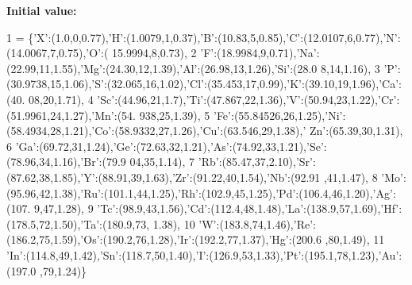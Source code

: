 {\bfseries Initial value\+:}
\begin{DoxyCode}
1 =  \{\textcolor{stringliteral}{'X'}:(1.0,0,0.77),\textcolor{stringliteral}{'H'}:(1.0079,1,0.37),\textcolor{stringliteral}{'B'}:(10.83,5,0.85),\textcolor{stringliteral}{'C'}:(12.0107,6,0.77),\textcolor{stringliteral}{'N'}:(14.0067,7,0.75),\textcolor{stringliteral}{'O'}:(
      15.9994,8,0.73),
2              \textcolor{stringliteral}{'F'}:(18.9984,9,0.71),\textcolor{stringliteral}{'Na'}:(22.99,11,1.55),\textcolor{stringliteral}{'Mg'}:(24.30,12,1.39),\textcolor{stringliteral}{'Al'}:(26.98,13,1.26),\textcolor{stringliteral}{'Si'}:(28.0
      8,14,1.16),
3              \textcolor{stringliteral}{'P'}:(30.9738,15,1.06),\textcolor{stringliteral}{'S'}:(32.065,16,1.02),\textcolor{stringliteral}{'Cl'}:(35.453,17,0.99),\textcolor{stringliteral}{'K'}:(39.10,19,1.96),\textcolor{stringliteral}{'Ca'}:(40.
      08,20,1.71),
4              \textcolor{stringliteral}{'Sc'}:(44.96,21,1.7),\textcolor{stringliteral}{'Ti'}:(47.867,22,1.36),\textcolor{stringliteral}{'V'}:(50.94,23,1.22),\textcolor{stringliteral}{'Cr'}:(51.9961,24,1.27),\textcolor{stringliteral}{'Mn'}:(54.
      938,25,1.39),
5              \textcolor{stringliteral}{'Fe'}:(55.84526,26,1.25),\textcolor{stringliteral}{'Ni'}:(58.4934,28,1.21),\textcolor{stringliteral}{'Co'}:(58.9332,27,1.26),\textcolor{stringliteral}{'Cu'}:(63.546,29,1.38),\textcolor{stringliteral}{'
      Zn'}:(65.39,30,1.31),
6              \textcolor{stringliteral}{'Ga'}:(69.72,31,1.24),\textcolor{stringliteral}{'Ge'}:(72.63,32,1.21),\textcolor{stringliteral}{'As'}:(74.92,33,1.21),\textcolor{stringliteral}{'Se'}:(78.96,34,1.16),\textcolor{stringliteral}{'Br'}:(79.9
      04,35,1.14),
7              \textcolor{stringliteral}{'Rb'}:(85.47,37,2.10),\textcolor{stringliteral}{'Sr'}:(87.62,38,1.85),\textcolor{stringliteral}{'Y'}:(88.91,39,1.63),\textcolor{stringliteral}{'Zr'}:(91.22,40,1.54),\textcolor{stringliteral}{'Nb'}:(92.91
      ,41,1.47),
8              \textcolor{stringliteral}{'Mo'}:(95.96,42,1.38),\textcolor{stringliteral}{'Ru'}:(101.1,44,1.25),\textcolor{stringliteral}{'Rh'}:(102.9,45,1.25),\textcolor{stringliteral}{'Pd'}:(106.4,46,1.20),\textcolor{stringliteral}{'Ag'}:(107.
      9,47,1.28),
9          \textcolor{stringliteral}{'Tc'}:(98.9,43,1.56),\textcolor{stringliteral}{'Cd'}:(112.4,48,1.48),\textcolor{stringliteral}{'La'}:(138.9,57,1.69),\textcolor{stringliteral}{'Hf'}:(178.5,72,1.50),\textcolor{stringliteral}{'Ta'}:(180.9,73,
      1.38),
10              \textcolor{stringliteral}{'W'}:(183.8,74,1.46),\textcolor{stringliteral}{'Re'}:(186.2,75,1.59),\textcolor{stringliteral}{'Os'}:(190.2,76,1.28),\textcolor{stringliteral}{'Ir'}:(192.2,77,1.37),\textcolor{stringliteral}{'Hg'}:(200.6
      ,80,1.49),
11              \textcolor{stringliteral}{'In'}:(114.8,49,1.42),\textcolor{stringliteral}{'Sn'}:(118.7,50,1.40),\textcolor{stringliteral}{'I'}:(126.9,53,1.33),\textcolor{stringliteral}{'Pt'}:(195.1,78,1.23),\textcolor{stringliteral}{'Au'}:(197.0
      ,79,1.24)\}
\end{DoxyCode}


